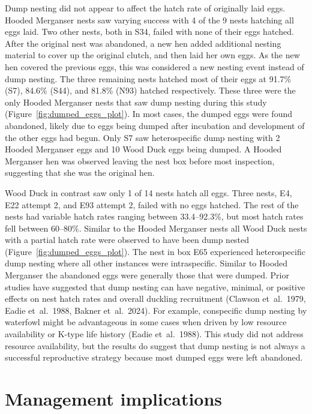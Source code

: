 Dump nesting did not appear to affect the hatch rate of originally laid eggs. Hooded Merganser nests saw varying success with 4 of the 9 nests hatching all eggs laid. Two other nests, both in S34, failed with none of their eggs hatched. After the original nest was abandoned, a new hen added additional nesting material to cover up the original clutch, and then laid her own eggs. As the new hen covered the previous eggs, this was considered a new nesting event instead of dump nesting. The three remaining nests hatched most of their eggs at 91.7\% (S7), 84.6\% (S44), and 81.8\% (N93) hatched respectively. These three were the only Hooded Merganser nests that saw dump nesting during this study (Figure~\ref{fig:dumped_eggs_plot}). In most cases, the dumped eggs were found abandoned, likely due to eggs being dumped after incubation and development of the other eggs had begun. Only S7 saw heterospecific dump nesting with 2 Hooded Merganser eggs and 10 Wood Duck eggs being dumped. A Hooded Merganser hen was observed leaving the nest box before most inspection, suggesting that she was the original hen.  

Wood Duck in contrast saw only 1 of 14 nests hatch all eggs. Three nests, E4, E22 attempt 2, and E93 attempt 2, failed with no eggs hatched. The rest of the nests had variable hatch rates ranging between 33.4–92.3\%, but most hatch rates fell between 60–80\%. Similar to the Hooded Merganser nests all Wood Duck nests with a partial hatch rate were observed to have been dump nested (Figure~\ref{fig:dumped_eggs_plot}). The nest in box E65 experienced heterospecific dump nesting where all other instances were intraspecific. Similar to Hooded Merganser the abandoned eggs were generally those that were dumped. Prior studies have suggested that dump nesting can have negative, minimal, or positive effects on nest hatch rates and overall duckling recruitment (Clawson et~al.~1979, Eadie et~al.~1988, Bakner et~al.~2024). For example, conspecific dump nesting by waterfowl might be advantageous in some cases when driven by low resource availability or K-type life history (Eadie et~al.~1988).  This study did not address resource availability, but the results do suggest that dump nesting is not always a successful reproductive strategy because most dumped eggs were left abandoned. 



\section*{Management implications}

